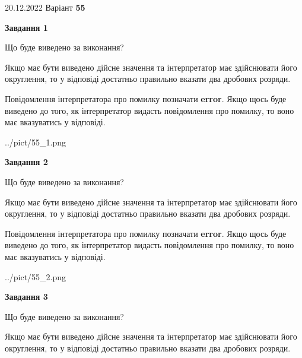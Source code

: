 \documentclass[12pt, ukrainian]{article}
\begin{document}
{20.12.2022 Варіант \No \textbf { 55 }\par}
{
\begin {Large}

{\begin {center}\textbf{Завдання 1}\end {center}}\par
Що буде виведено за виконання? \par

Якщо має бути виведено дійсне значення та інтерпретатор має здійснювати його округлення, 
то у відповіді достатньо правильно вказати два дробових розряди.

Повідомлення інтерпретатора про помилку позначати \textbf{error}.
Якщо щось буде виведено до того, як інтерпретатор видасть повідомлення про помилку, 
то воно має вказуватись у відповіді. \par

\begin{center}
	{../pict/55_1.png}
\end{center}
\newpage

{\begin {center}\textbf{Завдання 2}\end {center}}\par
Що буде виведено за виконання? \par

Якщо має бути виведено дійсне значення та інтерпретатор має здійснювати його округлення, 
то у відповіді достатньо правильно вказати два дробових розряди.

Повідомлення інтерпретатора про помилку позначати \textbf{error}.
Якщо щось буде виведено до того, як інтерпретатор видасть повідомлення про помилку, 
то воно має вказуватись у відповіді. \par

\begin{center}
	{../pict/55_2.png}
\end{center}
\newpage

{\begin {center}\textbf{Завдання 3}\end {center}}\par
Що буде виведено за виконання? \par

Якщо має бути виведено дійсне значення та інтерпретатор має здійснювати його округлення, 
то у відповіді достатньо правильно вказати два дробових розряди.


\end{Large}}
\end{document}
